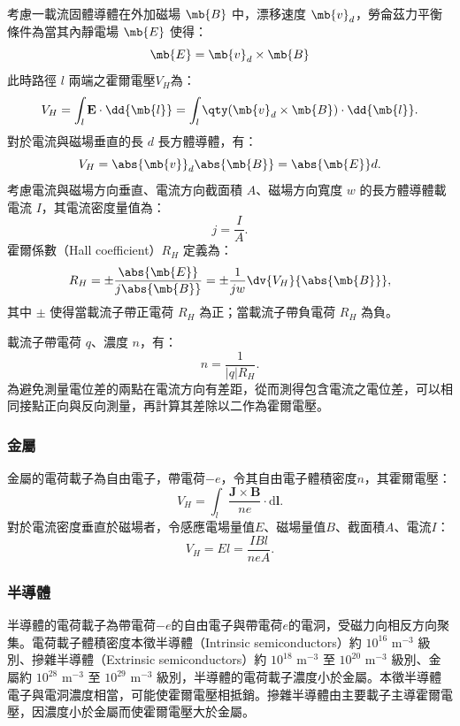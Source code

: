 \documentclass[a4paper,12pt]{report}
\begin{document}
\begin{itemize}
考慮一載流固體導體在外加磁場 $\mb{B}$ 中，漂移速度 $\mb{v}_d$，勞侖茲力平衡條件為當其內靜電場 $\mb{E}$ 使得：
\[\mb{E}=\mb{v}_d\times\mb{B}\]
此時路徑 $l$ 兩端之霍爾電壓$V_H$為：
\[V_H=\int_l\mathbf{E}\cdot\dd{\mb{l}}=\int_{l}\qty(\mb{v}_d\times\mb{B})\cdot\dd{\mb{l}}.\]
對於電流與磁場垂直的長 $d$ 長方體導體，有：
\[V_H=\abs{\mb{v}}_d\abs{\mb{B}}=\abs{\mb{E}}d.\]
考慮電流與磁場方向垂直、電流方向截面積 $A$、磁場方向寬度 $w$ 的長方體導體載電流 $I$，其電流密度量值為：
\[j=\frac{I}{A}.\]
霍爾係數（Hall coefficient）$R_H$ 定義為：
\[R_H=\pm\frac{\abs{\mb{E}}}{j\abs{\mb{B}}}=\pm\frac{1}{jw}\dv{V_H}{\abs{\mb{B}}},\]
其中 $\pm$ 使得當載流子帶正電荷 $R_H$ 為正；當載流子帶負電荷 $R_H$ 為負。

載流子帶電荷 $q$、濃度 $n$，有：
\[n=\frac{1}{|q|R_H}.\]
為避免測量電位差的兩點在電流方向有差距，從而測得包含電流之電位差，可以相同接點正向與反向測量，再計算其差除以二作為霍爾電壓。
\subsubsection{金屬}
金屬的電荷載子為自由電子，帶電荷$-e$，令其自由電子體積密度$n$，其霍爾電壓：
\[V_H=\int_{l}\frac{\mathbf{J}\times\mathbf{B}}{ne}\cdot\mathrm{d}\mathbf{l}.\]
對於電流密度垂直於磁場者，令感應電場量值$E$、磁場量值$B$、截面積$A$、電流$I$：
\[V_H=E l=\frac{IB l}{neA}.\]
\subsubsection{半導體}
半導體的電荷載子為帶電荷$-e$的自由電子與帶電荷$e$的電洞，受磁力向相反方向聚集。電荷載子體積密度本徵半導體（Intrinsic semiconductors）約 $10^{16}$ m$^{-3}$ 級別、摻雜半導體（Extrinsic semiconductors）約 $10^{18}$ m$^{-3}$ 至 $10^{20}$ m$^{-3}$ 級別、金屬約 $10^{28}$ m$^{-3}$ 至 $10^{29}$ m$^{-3}$ 級別，半導體的電荷載子濃度小於金屬。本徵半導體電子與電洞濃度相當，可能使霍爾電壓相抵銷。摻雜半導體由主要載子主導霍爾電壓，因濃度小於金屬而使霍爾電壓大於金屬。

\end{itemize}
\end{document}
